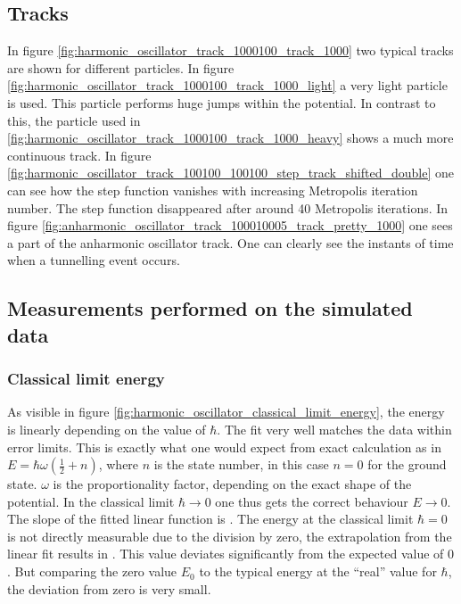 \documentclass{scrartcl}
\begin{document}
	\subsection{Tracks}
		In figure \ref{fig:harmonic_oscillator_track_1000100_track_1000} two typical tracks are shown for different particles.
		In figure \ref{fig:harmonic_oscillator_track_1000100_track_1000_light} a very light particle is used.
		This particle performs huge jumps within the potential.
		In contrast to this, the particle used in \ref{fig:harmonic_oscillator_track_1000100_track_1000_heavy} shows a much more continuous track.
		In figure \ref{fig:harmonic_oscillator_track_100100_100100_step_track_shifted_double} one can see how the step function vanishes with increasing Metropolis iteration number.
		The step function disappeared after around 40 Metropolis iterations.
		In figure \ref{fig:anharmonic_oscillator_track_100010005_track_pretty_1000} one sees a part of the anharmonic oscillator track.
		One can clearly see the instants of time when a tunnelling event occurs.

	\subsection{Measurements performed on the simulated data}
	\subsubsection{Classical limit energy}
		As visible in figure \ref{fig:harmonic_oscillator_classical_limit_energy}, the energy is linearly depending on the value of $\hbar$.
		The fit very well matches the data within error limits.
		This is exactly what one would expect from exact calculation as in $E = \hbar \omega \left(\frac 12 + n\right)$, where $n$ is the state number, in this case $n = 0$ for the ground state.
		$\omega$ is the proportionality factor, depending on the exact shape of the potential.
		In the classical limit $\hbar \rightarrow 0$ one thus gets the correct behaviour $E \rightarrow 0$.
		The slope of the fitted linear function is \unskip.
		The energy at the classical limit $\hbar = 0$ is not directly measurable due to the division by zero, the extrapolation from the linear fit results in \unskip.
		This value deviates significantly from the expected value of $0$.
		But comparing the zero value $E_0$ to the typical energy at the \enquote{real} value for $\hbar$, the deviation from zero is very small.
\end{document}
